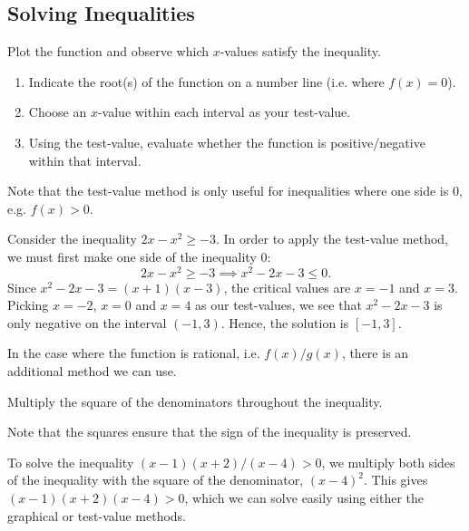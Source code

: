\subsection{Solving Inequalities}

\begin{recipe}
    Plot the function and observe which $x$-values satisfy the inequality.
\end{recipe}
\begin{recipe}
    \phantom{.}
    \renewcommand{\theenumi}{\arabic{enumi}.}%
    \begin{enumerate}
        \item Indicate the root(s) of the function on a number line (i.e. where $f(x) = 0$).
        \item Choose an $x$-value within each interval as your test-value.
        \item Using the test-value, evaluate whether the function is positive/negative within that interval.
    \end{enumerate}
    \renewcommand{\theenumi}{(\alph{enumi})}
\end{recipe}
Note that the test-value method is only useful for inequalities where one side is 0, e.g. $f(x) > 0$.

\begin{example}
    Consider the inequality $2x - x^2 \geq -3$. In order to apply the test-value method, we must first make one side of the inequality 0: \[2x - x^2 \geq -3 \implies x^2 - 2x - 3 \leq 0.\] Since $x^2 - 2x - 3 = (x+1)(x-3)$, the critical values are $x = -1$ and $x = 3$. Picking $x = -2$, $x = 0$ and $x = 4$ as our test-values, we see that $x^2 - 2x - 3$ is only negative on the interval $(-1, 3)$. Hence, the solution is $[-1, 3]$.
\end{example}

In the case where the function is rational, i.e. $f(x)/g(x)$, there is an additional method we can use.
\begin{recipe}
    Multiply the square of the denominators throughout the inequality.
\end{recipe}
Note that the squares ensure that the sign of the inequality is preserved.

\begin{example}
    To solve the inequality $(x-1)(x + 2)/(x - 4) > 0$, we multiply both sides of the inequality with the square of the denominator, $(x-4)^2$. This gives $(x-1)(x+2)(x-4) > 0$, which we can solve easily using either the graphical or test-value methods.
\end{example}

